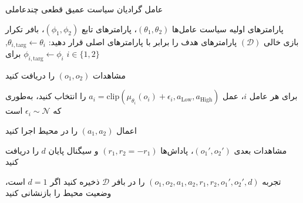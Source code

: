 \begin{algorithm}[H]
    \caption{عامل گرادیان سیاست عمیق قطعی چند­عاملی}\label{alg:MA-DDPG}
    \begin{algorithmic}[1]
         پارامترهای اولیه سیاست عامل‌ها $(\theta_1, \theta_2)$، پارامترهای تابع  $(\phi_1, \phi_2)$، بافر تکرار بازی خالی $(\mathcal{D})$
        \State پارامترهای هدف را برابر با پارامترهای اصلی قرار دهید: $\theta_{i,\text{targ}} \leftarrow \theta_i$, $\phi_{i,\text{targ}} \leftarrow \phi_i$ برای $i \in \{1, 2\}$
        
            \State \parbox[t]{\dimexpr\linewidth-\algorithmicindent}{
            مشاهدات $(o_1, o_2)$ را دریافت کنید
            \strut}
            \State \parbox[t]{\dimexpr\linewidth-\algorithmicindent}{
            برای هر عامل $i$، عمل $a_i = \text{clip}(\mu_{\theta_i}(o_i) + \epsilon_i, a_{\text{Low}}, a_{\text{High}})$ را انتخاب کنید، به‌طوری که $\epsilon_i \sim \mathcal{N}$ است
            \strut}
            \State اعمال $(a_1, a_2)$ را در محیط اجرا کنید
            \State \parbox[t]{\dimexpr\linewidth-\algorithmicindent}{
            مشاهدات بعدی $(o_1', o_2')$، پاداش‌ها $(r_1, r_2=-r_1)$ و سیگنال پایان $d$ را دریافت کنید
            \strut}
            \State تجربه $(o_1, o_2, a_1, a_2, r_1, r_2, o_1', o_2', d)$ را در بافر $\mathcal{D}$ ذخیره کنید
            \State اگر $d=1$ است، وضعیت محیط را بازنشانی کنید
            

\end{algorithmic}
\end{algorithm}

